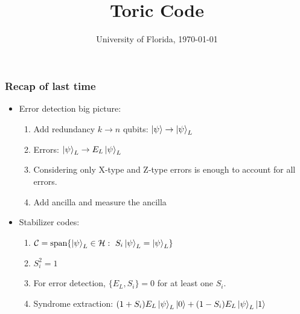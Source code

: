 \documentclass{beamer}
\title{Toric Code}
\date{University of Florida, \today}
\newcommand{\mc}{\mathcal}
\renewcommand{\(}{\left(}
\renewcommand{\)}{\right)}
\renewcommand{\[}{\left[}
\renewcommand{\]}{\right]}
\begin{document}
\frame{\titlepage} 



\begin{frame}
    \frametitle{Recap of last time}

    \begin{itemize}
        \item Error detection big picture: \begin{enumerate}
            \item Add redundancy $k \rightarrow n$ qubits: $\ket{\psi} \rightarrow \ket{\psi}_L$
            \item Errors: $\ket{\psi}_L \rightarrow E_L\ket{\psi}_L$ 
            \item Considering only X-type and Z-type errors is enough to account for all errors.
            \item Add ancilla and measure the ancilla 
        \end{enumerate}
        \item Stabilizer codes: \begin{enumerate}
            \item $\mc C = \text{span}\{\ket{\psi}_L \in \mc H : \ S_i\ket{\psi}_L = \ket{\psi}_L \}$
            \item $S_i^2 = 1$
            \item For error detection, $\{E_L,S_i\} = 0$ for at least one $S_i$. 
            \item Syndrome extraction: $(1+S_i)E_L \ket{\psi}_L \ket{0} + (1-S_i)E_L \ket{\psi}_L \ket{1}$
        \end{enumerate} 
        
    \end{itemize}

\end{frame}
\end{document}
